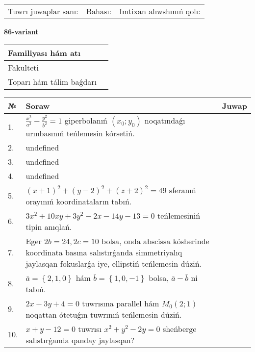 \documentclass{article}
\begin{document}
\vspace{0.7cm}

\begin{tabular}{lll}
Tuwrı juwaplar sanı: \underline{\hspace{1cm}} & 
Bahası: \underline{\hspace{1cm}} & 
Imtixan alıwshınıń qolı: \underline{\hspace{2cm}} \\
\end{tabular}

\egroup

\newpage


\textbf{86-variant}\\

\bgroup
\def\arraystretch{1.6} %

\begin{tabular}{|m{5.7cm}|m{9.5cm}|}
\hline
Familiyası hám atı & \\
\hline
Fakulteti  & \\
\hline
Toparı hám tálim baǵdarı  & \\
\hline
\end{tabular}

\vspace{0.7cm}

\begin{tabular}{|m{0.7cm}|m{10cm}|m{4cm}|}
\hline
№ & Soraw & Juwap \\
\hline
1. & \(\frac{x^{2}}{a^{2}} - \frac{y^{2}}{b^{2}} = 1\) giperbolanıń \((x_{0};y_{0})\) noqatındaǵı urınbasınıń teńlemesin kórsetiń. &  \\
\hline
2. & undefined &  \\
\hline
3. & undefined &  \\
\hline
4. & undefined &  \\
\hline
5. & \((x + 1) ^{2} + (y - 2) ^{2} + (z + 2) ^{2} = 49\) sferanıń orayınıń koordinataların tabıń. &  \\
\hline
6. & \(3 x^{2} + 10 xy + 3 y^{2} - 2 x - 14 y - 13 = 0\) teńlemesiniń tipin anıqlań. &  \\
\hline
7. & Eger \(2 b = 24, 2 c = 10\) bolsa, onda abscissa kósherinde koordinata basına salıstırǵanda simmetriyalıq jaylasqan fokuslarǵa iye, ellipstiń teńlemesin dúziń. &  \\
\hline
8. & \(\bar{a} = \left\{ 2, 1, 0 \right\}\) hám \(\bar{b} = \left\{ 1, 0,- 1 \right\}\) bolsa, \(\bar{a} - \bar{b}\) ni tabıń. &  \\
\hline
9. & \(2 x + 3 y + 4 = 0\) tuwrısına parallel hám \(M_{0} (2;1)\) noqattan ótetuǵın tuwrınıń teńlemesin dúziń. &  \\
\hline
10. & \(x + y - 12 = 0\) tuwrısı \(x^{2} + y^{2} - 2 y = 0\) sheńberge salıstırǵanda qanday jaylasqan? & \\
\hline
\end{tabular}
\end{document}

